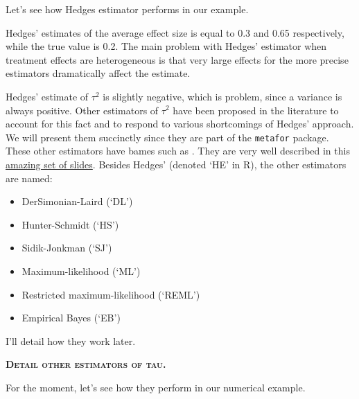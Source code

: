 \documentclass[]{book}
\providecommand{\tightlist}{%
  \setlength{\itemsep}{0pt}\setlength{\parskip}{0pt}}
\theoremstyle{definition}
\theoremstyle{definition}
\theoremstyle{definition}
\theoremstyle{remark}
\let\BeginKnitrBlock\begin \let\EndKnitrBlock\end
\begin{document}
\BeginKnitrBlock{example}
\protect\hypertarget{exm:unnamed-chunk-156}{}{\label{exm:unnamed-chunk-156} }Let's see how Hedges estimator performs in our example.
\EndKnitrBlock{example}

Hedges' estimates of the average effect size is equal to 0.3 and 0.65 respectively, while the true value is 0.2.
The main problem with Hedges' estimator when treatment effects are heterogeneous is that very large effects for the more precise estimators dramatically affect the estimate.

\BeginKnitrBlock{remark}
\iffalse{} {Remark. } \fi{}Hedges' estimate of \(\tau^2\) is slightly negative, which is problem, since a variance is always positive.
Other estimators of \(\tau^2\) have been proposed in the literature to account for this fact and to respond to various shortcomings of Hedges' approach.
We will present them succinctly since they are part of the \texttt{metafor} package.
These other estimators have bames such as .
They are very well described in this \href{http://www.edii.uclm.es/~useR-2013/Tutorials/kovalchik/kovalchik_meta_tutorial.pdf}{amazing set of slides}.
Besides Hedges' (denoted `HE' in R), the other estimators are named:
\EndKnitrBlock{remark}

\begin{itemize}
\tightlist
\item
  DerSimonian-Laird (`DL')
\item
  Hunter-Schmidt (`HS')
\item
  Sidik-Jonkman (`SJ')
\item
  Maximum-likelihood (`ML')
\item
  Restricted maximum-likelihood (`REML')
\item
  Empirical Bayes (`EB')
\end{itemize}

I'll detail how they work later.

\textbf{\textsc{Detail other estimators of tau.}}

\BeginKnitrBlock{example}
\protect\hypertarget{exm:unnamed-chunk-158}{}{\label{exm:unnamed-chunk-158} }For the moment, let's see how they perform in our numerical example.
\EndKnitrBlock{example}
\end{document}
